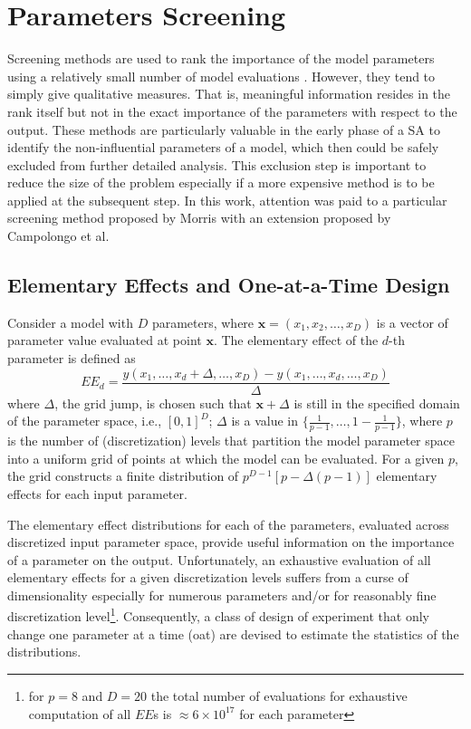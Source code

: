 \section{Parameters Screening}\label{sec:sa_parameters_screening}

Screening methods are used to rank the importance of the model parameters using a relatively small number of model evaluations \cite{Saltelli2004}.
However, they tend to simply give qualitative measures.
That is, meaningful information resides in the rank itself but not in the exact importance of the parameters with respect to the output. 
These methods are particularly valuable in the early phase of a SA to identify the non-influential parameters of a model,
which then could be safely excluded from further detailed analysis. 
This exclusion step is important to reduce the size of the problem especially if a more expensive method is to be applied at the subsequent step. 
In this work, attention was paid to a particular screening method proposed by Morris \cite{Morris1991} with an extension proposed by Campolongo et al. \cite{Campolongo2011}

\subsection{Elementary Effects and One-at-a-Time Design}\label{sub:sa_ee_oat}

Consider a model with $D$ parameters, where $\mathbf{x} = (x_1, x_2, \dots,x_D)$ is a vector of parameter value evaluated at point $\mathbf{x}$.
The elementary effect of the $d$-th parameter is defined as
\begin{equation}
EE_d = \frac{y(x_1, \dots, x_d+\Delta,\dots,x_D) - y(x_1, \dots, x_d,\dots,x_D)}{\Delta}
\end{equation}
where $\Delta$, the grid jump, is chosen such that $\mathbf{x} + \Delta$ is still in the specified domain of the parameter space, i.e., $[0,1]^D$; 
$\Delta$ is a value in $\{\frac{1}{p-1}, \dots, 1 - \frac{1}{p-1}\}$, 
where $p$ is the number of (discretization) levels that partition the model parameter space into a uniform grid of points at which the model can be evaluated. 
For a given $p$, the grid constructs a finite distribution of $p^{D-1}[p - \Delta(p-1)]$ elementary effects for each input parameter.

The elementary effect distributions for each of the parameters, evaluated across discretized input parameter space, 
provide useful information on the importance of a parameter on the output.
Unfortunately, an exhaustive evaluation of all elementary effects for a given discretization levels suffers from a curse of dimensionality especially for numerous parameters and/or for reasonably fine discretization level\footnote{for $p = 8$ and $D = 20$ the total number of evaluations for exhaustive computation of all $EE$s is $\approx 6 \times 10^{17}$ for each parameter}.
Consequently, a class of design of experiment that only change one parameter at a time (\gls{oat}) are devised to estimate the statistics of the distributions.
  

